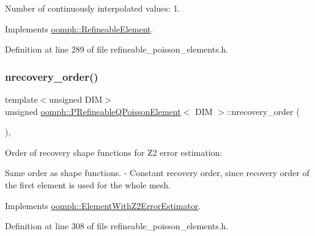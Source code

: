 Number of continuously interpolated values\+: 1. 



Implements \hyperlink{classoomph_1_1RefineableElement_a53e171a18c9f43f1db90a6876516a073}{oomph\+::\+Refineable\+Element}.



Definition at line 289 of file refineable\+\_\+poisson\+\_\+elements.\+h.

\mbox{\label{classoomph_1_1PRefineableQPoissonElement_a19ed70ed56d1e15f8af6eb6ad4a2d892}} 
\subsubsection{\texorpdfstring{nrecovery\+\_\+order()}{nrecovery\_order()}}
{\footnotesize\ttfamily template$<$unsigned D\+IM$>$ \\
unsigned \hyperlink{classoomph_1_1PRefineableQPoissonElement}{oomph\+::\+P\+Refineable\+Q\+Poisson\+Element}$<$ D\+IM $>$\+::nrecovery\+\_\+order (\begin{DoxyParamCaption}{ }\end{DoxyParamCaption})\hspace{0.3cm}{\ttfamily [inline]}, {\ttfamily [virtual]}}



Order of recovery shape functions for Z2 error estimation\+: 


\begin{DoxyItemize}
\item Same order as shape functions. -\/ Constant recovery order, since recovery order of the first element is used for the whole mesh. 
\end{DoxyItemize}

Implements \hyperlink{classoomph_1_1ElementWithZ2ErrorEstimator_af39480835bd3e0f6b2f4f7a9a4044798}{oomph\+::\+Element\+With\+Z2\+Error\+Estimator}.



Definition at line 308 of file refineable\+\_\+poisson\+\_\+elements.\+h.

\mbox{\label{classoomph_1_1PRefineableQPoissonElement_a9640f654f06259a532a62a23ed5f3ac7}} 
